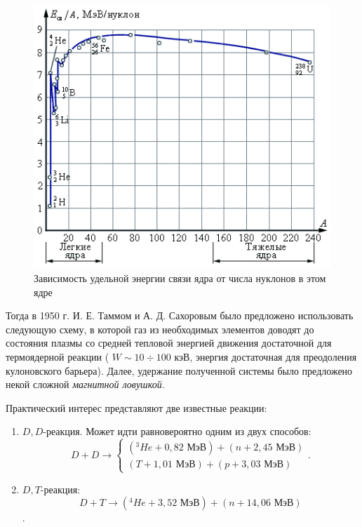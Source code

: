 \begin{figure}[h]
\centering
\includegraphics[width=0.7\linewidth]{../fig/ch1/link_energy}
\caption{Зависимость удельной энергии связи ядра от числа нуклонов в этом ядре}
\label{fig:link_energy}
\end{figure}

Тогда в 1950 г. И. Е. Таммом и А. Д. Сахоровым было предложено использовать следующую схему, в которой газ из необходимых элементов доводят до состояния плазмы со средней тепловой энергией движения достаточной для термоядерной реакции ( $W \sim 10 \div 100$ кэВ, энергия достаточная для преодоления кулоновского барьера). Далее, удержание полученной системы было предложено некой сложной \textit{магнитной ловушкой}.


Практический интерес представляют две известные реакции\cite{dnestrovsky}:
\begin{enumerate}
\item $D,D$-реакция. Может идти равновероятно одним из двух способов:
\begin{equation}
D + D \to
\begin{cases}
\left( ^3He + 0,82 \text{ МэВ}  \right) + \left( n + 2,45 \text{ МэВ} \right) \\
\left( T + 1,01 \text{ МэВ}  \right) + \left( p + 3,03 \text{ МэВ} \right)
\end{cases}.
\end{equation}
\item $D,T$-реакция:
\begin{equation}
D + T \to \left( ^4He + 3,52 \text{ МэВ}  \right) + \left( n + 14,06 \text{ МэВ} \right)
\label{eq:DT_rec}
\end{equation}.
\end{enumerate}

